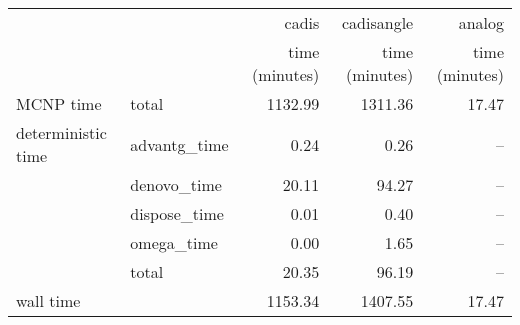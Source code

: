 \begin{tabular}{llrrr}
\toprule
          &              &          cadis &     cadisangle &         analog \\
          &              & time (minutes) & time (minutes) & time (minutes) \\
\midrule
MCNP time & total &        1132.99 &        1311.36 &          17.47 \\
deterministic time & advantg\_time &           0.24 &           0.26 &            -- \\
          & denovo\_time &          20.11 &          94.27 &            -- \\
          & dispose\_time &           0.01 &           0.40 &            -- \\
          & omega\_time &           0.00 &           1.65 &            -- \\
          & total &          20.35 &          96.19 &            -- \\
wall time &              &        1153.34 &        1407.55 &          17.47 \\
\bottomrule
\end{tabular}
